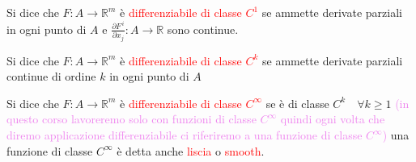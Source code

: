 \begin{definizione}
        Si dice che $F:A \to \mathbb{R}^m$ è \textcolor{red}{differenziabile di classe $C^1$} se ammette derivate parziali in ogni punto di $A$ e 
        $\displaystyle \frac{\partial F^{\,i}}{\partial x_j}:A \to \mathbb{R}$ sono continue.

        Si dice che $F:A \to \mathbb{R}^m$ è \textcolor{red}{differenziabile di classe $C^k$} se ammette derivate parziali continue di ordine $k$ in ogni punto di $A$

        Si dice che $F:A \to \mathbb{R}^m$ è \textcolor{red}{differenziabile di classe $C^\infty$} se è di classe $C^k \quad \forall k \geq 1$ \textcolor{violet}{(in questo corso
        lavoreremo solo con funzioni di classe $C^\infty$ quindi ogni volta che diremo applicazione differenziabile ci riferiremo a una funzione di classe $C^\infty$)} una funzione di classe $C^\infty$ è detta anche \textcolor{red}{liscia} o \textcolor{red}{smooth}.
        \end{definizione}
